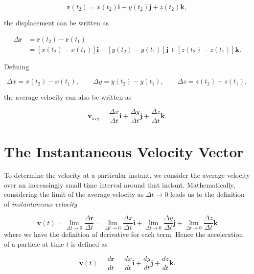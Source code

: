 \documentclass[12pt]{article}
\theoremstyle{remark}
\begin{document}
\begin{equation}
\mathbf{r}(t_2)
=
x(t_2)\mathbf{i}
+
y(t_2)\mathbf{j}
+
z(t_2)\mathbf{k},
\end{equation}

the displacement can be written as

\begin{equation}
\begin{aligned}
\Delta\mathbf{r}
&=
\mathbf{r}(t_2)-\mathbf{r}(t_1) \\
&=
\left[x(t_2)-x(t_1)\right]\mathbf{i}
+
\left[y(t_2)-y(t_1)\right]\mathbf{j}
+
\left[z(t_2)-z(t_1)\right]\mathbf{k}.
\end{aligned}
\end{equation}

Defining

\begin{equation}
\Delta x = x(t_2)-x(t_1), \qquad
\Delta y = y(t_2)-y(t_1), \qquad
\Delta z = z(t_2)-z(t_1),
\end{equation}

the average velocity can also be written as

\begin{equation}
\mathbf{v}_{\mathrm{avg}}
=
\frac{\Delta x}{\Delta t}\mathbf{i}
+
\frac{\Delta y}{\Delta t}\mathbf{j}
+
\frac{\Delta z}{\Delta t}\mathbf{k}.
\end{equation}

\section{The Instantaneous Velocity Vector}

To determine the velocity at a particular instant, we consider the average velocity over an increasingly small time interval around that instant. Mathematically, considering the limit of the average velocity as $\Delta t \rightarrow 0$ leads us to the definition of \emph{instantaneous velocity}

\begin{equation}
\mathbf{v}(t) =
\lim_{\Delta t\rightarrow 0}
\frac{\Delta\mathbf{r}}{\Delta t} =
\lim_{\Delta t\rightarrow 0}\frac{\Delta x}{\Delta t}\mathbf{i}
+
\lim_{\Delta t\rightarrow 0}\frac{\Delta y}{\Delta t}\mathbf{j}
+
\lim_{\Delta t\rightarrow 0}\frac{\Delta z}{\Delta t}\mathbf{k}
\end{equation}
where we have the definition of derivative for each term. Hence the acceleration of a particle at time $t$ is defined as


\begin{equation}
\mathbf{v}(t) = \frac{d\mathbf{r}}{dt} =
\frac{dx}{dt}\mathbf{i}
+
\frac{dy}{dt}\mathbf{j}
+
\frac{dz}{dt}\mathbf{k}.
\end{equation}
\end{document}
